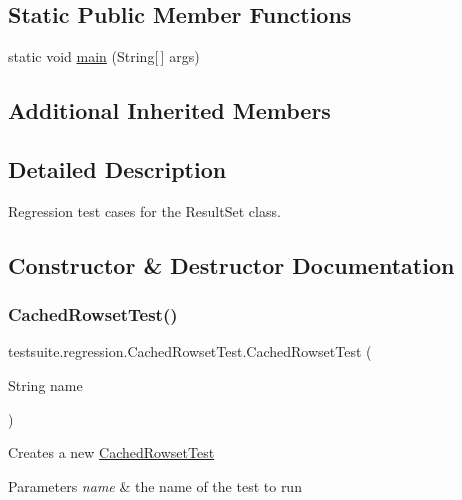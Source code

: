 \subsection*{Static Public Member Functions}
\begin{DoxyCompactItemize}
\item 
static void \mbox{\hyperlink{classtestsuite_1_1regression_1_1_cached_rowset_test_a66de4a98e7241932f80981d0efa979be}{main}} (String\mbox{[}$\,$\mbox{]} args)
\end{DoxyCompactItemize}
\subsection*{Additional Inherited Members}


\subsection{Detailed Description}
Regression test cases for the Result\+Set class. 

\subsection{Constructor \& Destructor Documentation}
\mbox{\label{classtestsuite_1_1regression_1_1_cached_rowset_test_a928cdd9b59eb0bbfcc9e8332f935624e}} 
\subsubsection{\texorpdfstring{Cached\+Rowset\+Test()}{CachedRowsetTest()}}
{\footnotesize\ttfamily testsuite.\+regression.\+Cached\+Rowset\+Test.\+Cached\+Rowset\+Test (\begin{DoxyParamCaption}\item[{String}]{name }\end{DoxyParamCaption})}

Creates a new \mbox{\hyperlink{classtestsuite_1_1regression_1_1_cached_rowset_test}{Cached\+Rowset\+Test}}


\begin{DoxyParams}{Parameters}
{\em name} & the name of the test to run \\
\hline
\end{DoxyParams}


